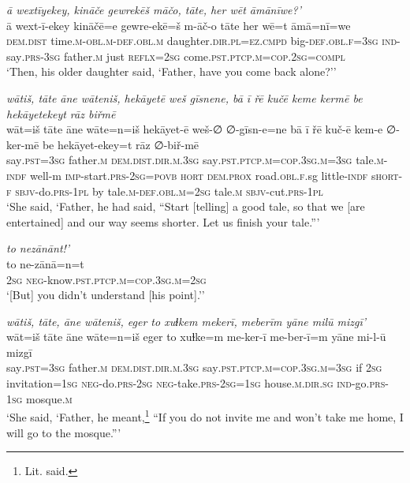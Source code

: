 \ea \label{ŽH.22}
\textit{ā wextīyekey, kināče gewrekēš māčo, tāte, her wēt āmānīwe?’} \\ 
\gll ā wext-ī-ekey kināčē=e gewre-ekē=š m-āč-o tāte her wē=t āmā=nī=we \\ 
 \textsc{dem.dist} time\textsc{.m}\textsc{-obl}\textsc{.m}\textsc{-def}\textsc{.obl}\textsc{.m} daughter\textsc{.dir}\textsc{.pl}\textsc{=ez}\textsc{.cmpd} big\textsc{-def}\textsc{.obl}\textsc{\textsc{.f}}\textsc{=3sg} \textsc{ind-}say\textsc{.prs}\textsc{-3sg} father\textsc{.m} just \textsc{reflx}\textsc{=\textsc{2sg}} come\textsc{.pst}\textsc{.ptcp}\textsc{.m}\textsc{=cop}\textsc{.\textsc{2sg}}\textsc{=compl} \\ 
\glt `Then, his older daughter said, ‘Father, have you come back alone?’'
\z 
 
\ea \label{ŽH.27}
\textit{wātiš, tāte āne wāteniš, hekāyetē weš gīsnene, bā ī řē kučē keme kermē be hekāyetekeyt rāz biřmē} \\ 
\gll wāt=iš tāte āne wāte=n=iš hekāyet-ē weš-∅ ∅-gīsn-e=ne bā ī řē kuč-ē kem-e ∅-ker-mē be hekāyet-ekey=t rāz ∅-biř-mē \\ 
 say\textsc{.pst}\textsc{=3sg} father\textsc{.m} \textsc{dem.dist}\textsc{.dir}\textsc{.m}\textsc{.3sg} say\textsc{.pst}\textsc{.ptcp}\textsc{.m}\textsc{=cop}\textsc{.3sg}\textsc{.m}\textsc{=3sg} tale\textsc{.m}\textsc{-indf} well-m \textsc{imp-}start\textsc{.prs}-\textsc{2sg}\textsc{=\textsc{povb}} \textsc{hort} \textsc{dem.prox} road\textsc{.obl}\textsc{\textsc{.f}}.sg little\textsc{-indf} s\textsc{hort}\textsc{-f} \textsc{sbjv-}do\textsc{.prs}\textsc{-1pl} by tale\textsc{.m}\textsc{-def}\textsc{.obl}\textsc{.m}\textsc{=\textsc{2sg}} tale\textsc{.m} \textsc{sbjv-}cut\textsc{.prs}\textsc{-1pl} \\ 
\glt `She said, ‘Father, he had said, “Start [telling] a good tale, so that we [are entertained] and our way seems shorter. Let us finish your tale.”'
\z 
 
\ea \label{ŽH.28}
\textit{to nezānānt!’} \\ 
\gll to ne-zānā=n=t \\ 
 \textsc{2sg} \textsc{neg-}know\textsc{.pst}\textsc{.ptcp}\textsc{.m}\textsc{=cop}\textsc{.3sg}\textsc{.m}\textsc{=\textsc{2sg}} \\ 
\glt `[But] you didn’t understand [his point].’'
\z 
 
\ea \label{ŽH.33}
\textit{wātiš, tāte, āne wāteniš, eger to xuɫkem mekerī, meberīm yāne milū mizgī’} \\ 
\gll wāt=iš tāte āne wāte=n=iš eger to xuɫke=m me-ker-ī me-ber-ī=m yāne mi-l-ū mizgī \\ 
 say\textsc{.pst}\textsc{=3sg} father\textsc{.m} \textsc{dem.dist}\textsc{.dir}\textsc{.m}\textsc{.3sg} say\textsc{.pst}\textsc{.ptcp}\textsc{.m}\textsc{=cop}\textsc{.3sg}\textsc{.m}\textsc{=3sg} if \textsc{2sg} invitation\textsc{=1sg} \textsc{neg-}do\textsc{.prs}-\textsc{2sg} \textsc{neg-}take\textsc{.prs}-\textsc{2sg}\textsc{=1sg} house\textsc{.m}\textsc{.dir.sg} \textsc{ind-}go\textsc{.prs}\textsc{-1sg} mosque\textsc{.m} \\ 
\glt `She said, ‘Father, he meant,\footnote{Lit. said.} “If you do not invite me and won’t take me home, I will go to the mosque.”'
\z 
 
